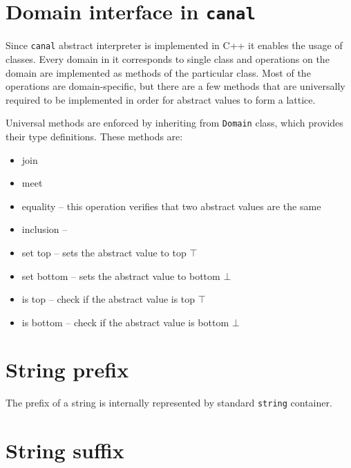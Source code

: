 \documentclass[12pt,final,oneside]{fithesis2}
\theoremstyle{definition}
\begin{document}
\section{Domain interface in \texttt{canal}}

Since \texttt{canal} abstract interpreter is implemented in C++ it enables
the usage of classes. Every domain in it corresponds to single class and
operations on the domain are implemented as methods of the particular class.
Most of the operations are domain-specific, but there are a few methods
that are universally required to be implemented in order for abstract
values to form a lattice.

Universal methods are enforced by inheriting from \texttt{Domain} class,
which provides their type definitions. These methods are:

\begin{itemize}

\item join

\item meet

\item equality -- this operation verifies that two abstract values are the same

\item inclusion --

\item set top -- sets the abstract value to top $\top$

\item set bottom -- sets the abstract value to bottom $\bot$

\item is top -- check if the abstract value is top $\top$

\item is bottom -- check if the abstract value is bottom $\bot$

\end{itemize}


\section{String prefix}

The prefix of a string is internally represented by standard \texttt{string} container.



\section{String suffix}
\end{document}
